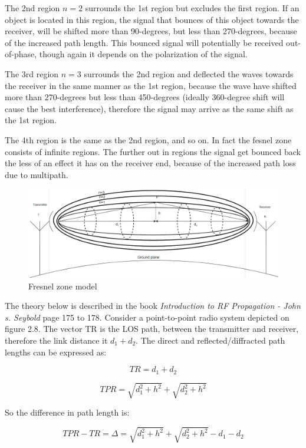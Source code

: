The 2nd region $n=2$ surrounds the 1st region but excludes the first region. If an object is located in this region, the signal that bounces of this object towards the receiver, will be shifted more than 90-degrees, but less than 270-degrees, because of the increased path length. This bounced signal will potentially be received out-of-phase, though again it depends on the polarization of the signal.

The 3rd region $n=3$ surrounds the 2nd region and deflected the waves towards the receiver in the same manner as the 1st region, because the wave have shifted more than 270-degrees but less than 450-degrees (ideally 360-degree shift will cause the best interference), therefore the signal may arrive as the same shift as the 1st region. 

The 4th region is the same as the 2nd region, and so on. In fact the fesnel zone consists of infinite regions. The further out in regions the signal get bounced back the less of an effect it has on the receiver end, because of the increased path loss due to multipath.\cite{FesnelZone}  

\begin{figure}[h]
\hspace{-3cm}
\includegraphics[scale=0.6]{figures/FresnelZoneN.PNG}
\caption{Fresnel zone model}
\end{figure}

The theory below is described in the book \textit{Introduction to RF Propagation - John s. Seybold}\cite{RFpropagation} page 175 to 178.
Consider a point-to-point radio system depicted on figure 2.8. The vector TR is the LOS path, between the transmitter and receiver, therefore the link distance it $d_1 + d_2$. The direct and reflected/diffracted path lengths can be expressed as: 

$$TR=d_1 + d_2$$

$$TPR=\sqrt{d_1^2+h^2}+\sqrt{d_2^2+h^2}$$

So the difference in path length is:

\begin{equation}
  TPR-TR = \Delta = \sqrt{d_1^2+h^2}+\sqrt{d_2^2+h^2}-d_1-d_2
\end{equation}

